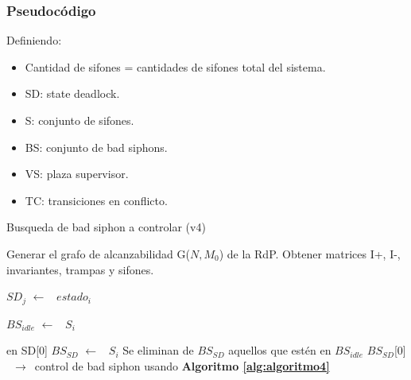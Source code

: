 \subsubsection{Pseudocódigo}
\noindent Definiendo:
\begin{itemize}
    \item Cantidad de sifones = cantidades de sifones total del sistema.
    \item SD: state deadlock.
    \item S: conjunto de sifones.
    \item BS: conjunto de bad siphons.
    \item VS: plaza supervisor.
    \item TC: transiciones en conflicto. 
\end{itemize}

\begin{algorithm} [H]
  \caption{Busqueda de bad siphon a controlar (v4)}
  \label{alg:algoritmo3} 
  \begin{algorithmic}[1]
 
 
    \State Generar el grafo de alcanzabilidad G($N,M_0$) de la RdP.
    \State Obtener matrices I+, I-, invariantes, trampas y sifones.
 
            \State $SD_j$ $\leftarrow$ \ $estado_i$
        \EndIf
    \EndFor
    
                \State $BS_{idle}$ $\leftarrow$ \  $S_i$
            \EndIf
        \EndFor
    \EndIf
    
    \State en SD[0]
            \State $BS_{SD}$ $\leftarrow$ \ $S_i$  
        \EndIf
    \EndFor
    \State Se eliminan de $BS_{SD}$ aquellos que estén en $BS_{idle}$ 
    \State $BS_{SD}$[0] \  $\rightarrow$\ control de bad siphon usando \textbf{Algoritmo \ref{alg:algoritmo4}}
  \end{algorithmic}
\end{algorithm}
    

